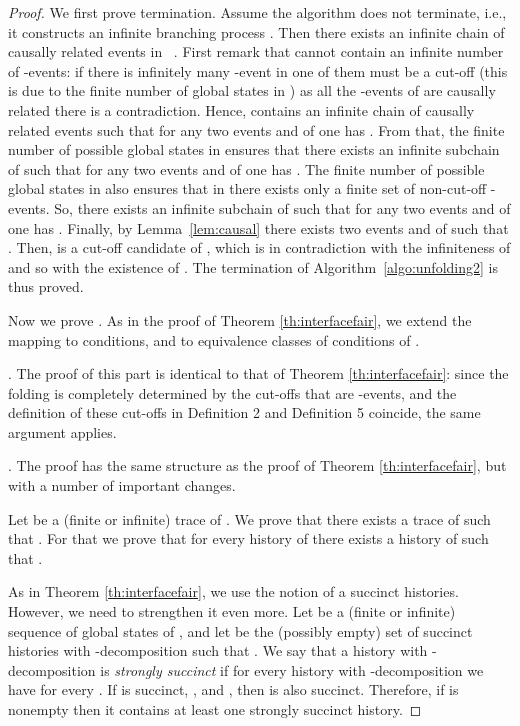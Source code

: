 \documentclass{llncs}
\begin{document}
\begin{proof}
We first prove termination. Assume the algorithm does not terminate, i.e., it constructs an
infinite branching process .
Then there exists an infinite chain  of causally related events in ~\cite{Khomenko03}.
First remark that  cannot contain an infinite number of -events:
if there is infinitely many -event in  one of them must be a cut-off (this is due to the finite number of global states in ) as all the -events of  are causally related there is a contradiction.
Hence,  contains an infinite chain  of causally related events such that for any two events  and  of  one has .
From that, the finite number of possible global states in  ensures that there exists an infinite subchain  of  such that for any two events  and  of  one has . 
The finite number of possible global states in  also ensures that in  there exists only a finite set of non-cut-off -events.
So, there exists an infinite subchain  of  such that for any two events  and  of  one has .
Finally, by Lemma~\ref{lem:causal} there exists two events  and  of  such that .
Then,  is a cut-off candidate of , which is in contradiction with the infiniteness of  and so with the existence of .
The termination of Algorithm~\ref{algo:unfolding2} is thus proved.

\vspace{0.2cm}
Now we prove . As in the proof of Theorem 
\ref{th:interfacefair}, we extend the mapping  to conditions, and to equivalence classes of
conditions of . 

. The proof of this part is identical to
that of Theorem \ref{th:interfacefair}: since the folding  is completely determined by the cut-offs
that are -events, and the definition of these cut-offs in Definition 2 and Definition 5
coincide, the same argument applies. 

. The proof has the same structure 
as the proof of Theorem \ref{th:interfacefair}, but with a number of important changes. 

Let  be a (finite or infinite) trace of .
We prove that there exists a trace  of  such that .
For that we prove that for every history  of  there exists a history  of  
such that .

As in Theorem \ref{th:interfacefair}, we use the notion of a succinct histories. However, we need
to strengthen it even more. Let  be a (finite or infinite) sequence of
global states of , and let  be the (possibly empty) set of 
succinct histories  with -decomposition
 such that . 
We say that a history  with -decomposition 
is {\em strongly succinct} if for every history  with -decomposition
 we have  for every .
If  is succinct, , and 
, then  is also succinct. Therefore,
if  is nonempty then it contains at least one strongly succinct history.


\end{proof}
\end{document}
